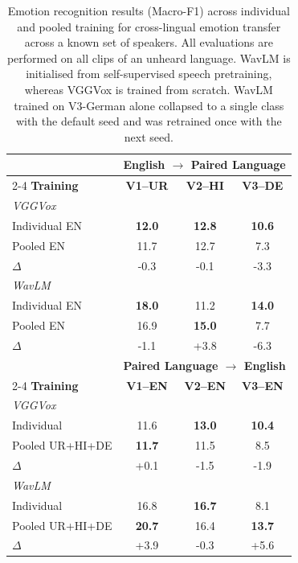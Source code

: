\begin{table}[t]
\footnotesize
\centering
\caption{Emotion recognition results (Macro-F1) across individual and pooled training for cross-lingual emotion transfer across a known set of speakers. All evaluations are performed on all clips of an unheard language. WavLM is initialised from self-supervised speech pretraining, whereas VGGVox is trained from scratch. WavLM trained on V3-German alone collapsed to a single class with the default seed and was retrained once with the next seed.}
\label{tab:pooled_transfer}
\setlength{\tabcolsep}{7pt}
\renewcommand{\arraystretch}{1.1}

\begin{tabular}{lccc}
\toprule
& \multicolumn{3}{c}{\textbf{English $\rightarrow$ Paired Language}} \\
\cmidrule(lr){2-4}
\textbf{Training} &
\textbf{V1--UR} &
\textbf{V2--HI} &
\textbf{V3--DE} \\
\midrule
\multicolumn{4}{l}{\textit{VGGVox}} \\
Individual EN
    & \textbf{12.0} & \textbf{12.8} & \textbf{10.6} \\
Pooled EN
    & 11.7 & 12.7 & 7.3 \\
\midrule
$\Delta$
    & -0.3 & -0.1 & -3.3 \\
\midrule
\multicolumn{4}{l}{\textit{WavLM}} \\
Individual EN
    & \textbf{18.0} & 11.2 & \textbf{14.0} \\
Pooled EN
    & 16.9 & \textbf{15.0} & 7.7 \\
\midrule
$\Delta$
    & -1.1 & +3.8 & -6.3 \\
\midrule
\midrule

& \multicolumn{3}{c}{\textbf{Paired Language $\rightarrow$ English}} \\
\cmidrule(lr){2-4}
\textbf{Training} &
\textbf{V1--EN} &
\textbf{V2--EN} &
\textbf{V3--EN} \\
\midrule
\multicolumn{4}{l}{\textit{VGGVox}} \\
Individual
    & 11.6 & \textbf{13.0} & \textbf{10.4} \\
Pooled UR+HI+DE
    & \textbf{11.7} & 11.5 & 8.5 \\
\midrule
$\Delta$
    & +0.1 & -1.5 & -1.9 \\
\midrule
\multicolumn{4}{l}{\textit{WavLM}} \\
Individual
    & 16.8 & \textbf{16.7} & 8.1 \\
Pooled UR+HI+DE
    & \textbf{20.7} & 16.4 & \textbf{13.7} \\
\midrule
$\Delta$
    & +3.9 & -0.3 & +5.6 \\
\bottomrule
\end{tabular}
\end{table}
